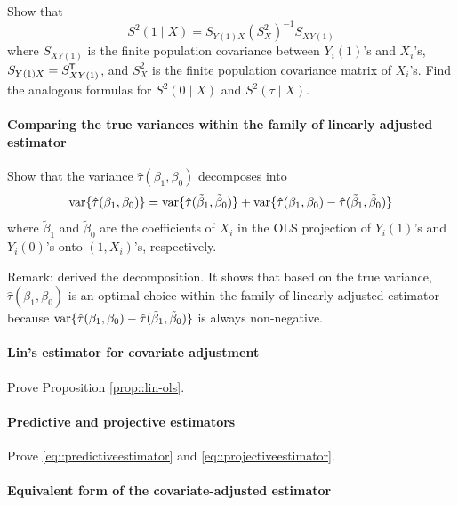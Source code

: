 Show that
$$
S^2(1\mid X) = S_{Y(1)X} (S_X^2)^{-1} S_{XY(1)}
$$
where $S_{XY(1)}$ is the finite population covariance between $Y_i(1)$'s and $X_i$'s, $S_{Y(1)X} = S_{XY(1)}^{\mkern-1.5mu\mathsf{T}}$, and $S_X^2$ is the finite population covariance matrix of $X_i$'s. 
Find the analogous formulas for $S^2(0\mid X) $ and $S^2(\tau\mid X) .$



\paragraph{Comparing the true variances within the family of linearly adjusted estimator}\label{hw::compare-true-variance} 



Show that the variance $\hat{\tau}(\beta_1, \beta_0)$ decomposes into
$$
\textup{var}\{ \hat{\tau}(\beta_1, \beta_0) \} 
=  
\textup{var}\{ \hat{\tau}( \tilde{\beta}_1, \tilde{\beta}_0) \}  
+
\textup{var}\{ \hat{\tau}(\beta_1, \beta_0) - \hat{\tau}(\tilde{\beta}_1, \tilde{\beta}_0) \}
$$
where $\tilde{\beta}_1$ and $\tilde{\beta}_0$ are the coefficients of $X_i$ in the OLS projection of $Y_i(1)$'s and $Y_i(0)$'s onto $(1, X_i)$'s, respectively. 



Remark: \citet[][Example 9]{li2017general} derived the decomposition. It shows that based on the true variance, $\hat{\tau}( \tilde{\beta}_1, \tilde{\beta}_0)$ is an optimal choice within the family of linearly adjusted estimator because $\textup{var}\{ \hat{\tau}(\beta_1, \beta_0) - \hat{\tau}(\tilde{\beta}_1, \tilde{\beta}_0) \}$ is always non-negative.   




\paragraph{Lin's estimator for covariate adjustment}\label{para::lin-ols-covadj}

Prove Proposition \ref{prop::lin-ols}. 

\paragraph{Predictive and projective estimators}\label{para::predictiveestimator}
Prove \eqref{eq::predictiveestimator} and \eqref{eq::projectiveestimator}. 
 
 
 \paragraph{Equivalent form of the covariate-adjusted estimator}\label{para::reg-covariate-imbalance}

